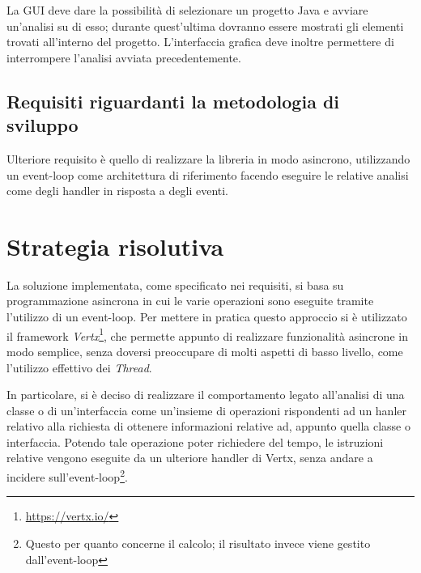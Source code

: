 La GUI deve dare la possibilità di selezionare un progetto Java e avviare un'analisi su di esso; durante quest'ultima dovranno essere mostrati gli elementi trovati all'interno del progetto. L'interfaccia grafica deve inoltre permettere di interrompere l'analisi avviata precedentemente.

\subsection{Requisiti riguardanti la metodologia di sviluppo}

Ulteriore requisito è quello di realizzare la libreria in modo asincrono, utilizzando un event-loop come architettura di riferimento facendo eseguire le relative analisi come degli handler in risposta a degli eventi.


%

\section{Strategia risolutiva}

La soluzione implementata, come specificato nei requisiti, si basa su programmazione asincrona in cui le varie operazioni sono eseguite tramite l'utilizzo di un event-loop.
%
Per mettere in pratica questo approccio si è utilizzato il framework \textit{Vertx}\footnote{\url{https://vertx.io/}}, che permette appunto di realizzare funzionalità asincrone in modo semplice, senza doversi preoccupare di molti aspetti di basso livello, come l'utilizzo effettivo dei \textit{Thread}.

In particolare, si è deciso di realizzare il comportamento legato all'analisi di una classe o di un'interfaccia come un'insieme di operazioni rispondenti ad un hanler relativo alla richiesta di ottenere informazioni relative ad, appunto quella classe o interfaccia. Potendo tale operazione poter richiedere del tempo, le istruzioni relative vengono eseguite da un ulteriore handler di Vertx, senza andare a incidere sull'event-loop\footnote{Questo per quanto concerne il calcolo; il risultato invece viene gestito dall'event-loop}.
%

